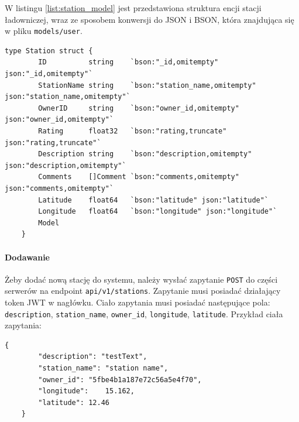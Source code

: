 W listingu \ref{list:station_model} jest przedstawiona struktura encji stacji ładowniczej, wraz ze sposobem konwersji do JSON i BSON, która znajdująca się w pliku \texttt{models/user}.
\begin{lstlisting}[label=list:station_model,caption=Model danych stacji ładowniczej,basicstyle=\tiny\ttfamily]
    type Station struct {
        ID          string    `bson:"_id,omitempty" json:"_id,omitempty"`
        StationName string    `bson:"station_name,omitempty" json:"station_name,omitempty"`
        OwnerID     string    `bson:"owner_id,omitempty" json:"owner_id,omitempty"`
        Rating      float32   `bson:"rating,truncate" json:"rating,truncate"`
        Description string    `bson:"description,omitempty" json:"description,omitempty"`
        Comments    []Comment `bson:"comments,omitempty" json:"comments,omitempty"`
        Latitude    float64   `bson:"latitude" json:"latitude"`
        Longitude   float64   `bson:"longitude" json:"longitude"`
        Model
    }
\end{lstlisting}

\paragraph{Dodawanie\newline}
Żeby dodać nową stację do systemu, należy wysłać zapytanie \texttt{POST} do części serwerów na endpoint \texttt{api/v1/stations}. Zapytanie musi posiadać działający token JWT w nagłówku. Ciało zapytania musi posiadać następujące pola: \texttt{description}, \texttt{station\_name}, \texttt{owner\_id}, \texttt{longitude}, \texttt{latitude}.
Przykład ciała zapytania:
\begin{lstlisting}[basicstyle=\tiny\ttfamily]
    {
		"description": "testText",
		"station_name": "station name",
		"owner_id": "5fbe4b1a187e72c56a5e4f70",
		"longitude":    15.162,
		"latitude": 12.46
    }
\end{lstlisting}

